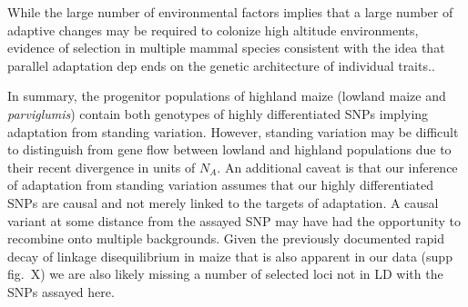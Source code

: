 
While the large number of environmental factors implies that a large number of adaptive changes may be required to colonize     high altitude environments, evidence of selection in multiple mammal species consistent with the idea that parallel adaptation dep    ends on the genetic architecture of individual traits.\cite[]{Yi_2010_20595611,Simonson_2010_20466884,Storz_2007_17397259,Qiu_2012_    22751099}.

In summary, the progenitor populations of highland maize (lowland maize and \emph{parviglumis}) contain both genotypes of highly differentiated SNPs implying adaptation from standing variation.
However, standing variation may be difficult to distinguish from gene flow between lowland and highland populations due to their recent divergence in units of $N_A$.
An additional caveat is that our inference of adaptation from standing variation assumes that our highly differentiated SNPs are causal and not merely linked to the targets of adaptation.  A causal variant at some distance from the assayed SNP may have had the opportunity to recombine onto multiple backgrounds. 
Given the previously documented rapid decay of linkage disequilibrium in maize \cite[]{Tenaillon_2001_11470895,Remington_2001_11562485} that is also apparent in our data (supp fig.~X) we are also likely missing a number of selected loci not in LD with the SNPs assayed here.





